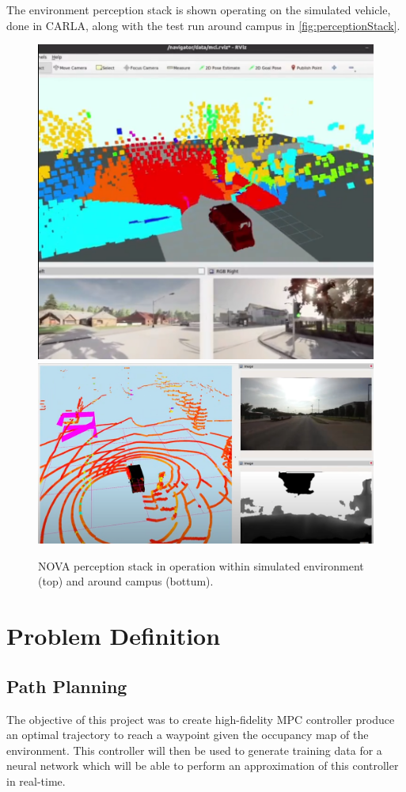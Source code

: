 \documentclass[]{IEEEtran}
\begin{document}
The environment perception stack is shown operating on the simulated vehicle, done in CARLA\cite{carla,dosovitskiy2017carla}, along with the test run around campus in \autoref{fig:perceptionStack}.

\begin{figure}
    \centering
    \includegraphics[width = 0.5 \columnwidth]{figs/NOVA-carla_screenshot.png}\\
    \vspace{0.5em}
    \includegraphics[width = 0.7 \columnwidth]{figs/NOVA-sensorData_screenshot.png}
    \caption{NOVA perception stack in operation within simulated environment (top) and around campus (bottum).}
\label{fig:perceptionStack}
\end{figure}

\section{Problem Definition}
\label{sec:pblm_def}
\subsection{Path Planning}
\label{subsec:pathPlanning}

The objective of this project was to create high-fidelity MPC controller produce an optimal trajectory to reach a waypoint given the occupancy map of the environment.
This controller will then be used to generate training data for a neural network which will be able to perform an approximation of this controller in real-time.
\end{document}
